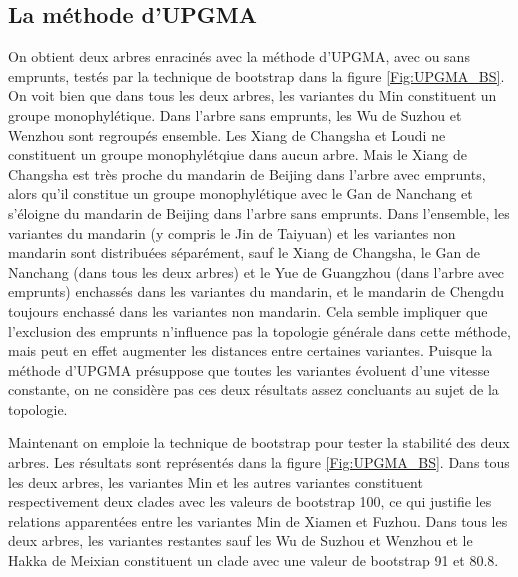 \documentclass{scrbook}
\newcounter{c}[subsubsection]
\begin{document}
\begin{sloppypar}
\subsection{La méthode d'UPGMA}
On obtient deux arbres enracinés avec la méthode d'UPGMA, avec ou sans emprunts, testés par la technique de bootstrap dans la figure \ref{Fig:UPGMA_BS}. On voit bien que dans tous les deux arbres, les variantes du Min constituent un groupe monophylétique. Dans l'arbre sans emprunts, les Wu de Suzhou et Wenzhou sont regroupés ensemble. Les Xiang de Changsha et Loudi ne constituent un groupe monophylétqiue dans aucun arbre. Mais le Xiang de Changsha est très proche du mandarin de Beijing dans l'arbre avec emprunts, alors qu'il constitue un groupe monophylétique avec le Gan de Nanchang et s'éloigne du mandarin de Beijing dans l'arbre sans emprunts. Dans l'ensemble, les variantes du mandarin (y compris le Jin de Taiyuan) et les variantes non mandarin sont distribuées séparément, sauf le Xiang de Changsha, le Gan de Nanchang (dans tous les deux arbres) et le Yue de Guangzhou (dans l'arbre avec emprunts) enchassés dans les variantes du mandarin, et le mandarin de Chengdu toujours enchassé dans les variantes non mandarin. Cela semble impliquer que l'exclusion des emprunts n'influence pas la topologie générale dans cette méthode, mais peut en effet augmenter les distances entre certaines variantes. Puisque la méthode d'UPGMA présuppose que toutes les variantes évoluent d'une vitesse constante, on ne considère pas ces deux résultats assez concluants au sujet de la topologie.

Maintenant on emploie la technique de bootstrap pour tester la stabilité des deux arbres. Les résultats sont représentés dans la figure \ref{Fig:UPGMA_BS}. Dans tous les deux arbres, les variantes Min et les autres variantes constituent respectivement deux clades avec les valeurs de bootstrap 100, ce qui justifie les relations apparentées entre les variantes Min de Xiamen et Fuzhou. Dans tous les deux arbres, les variantes restantes sauf les Wu de Suzhou et Wenzhou et le Hakka de Meixian constituent un clade avec une valeur de bootstrap 91 et 80.8.


\end{sloppypar}
\end{document}
